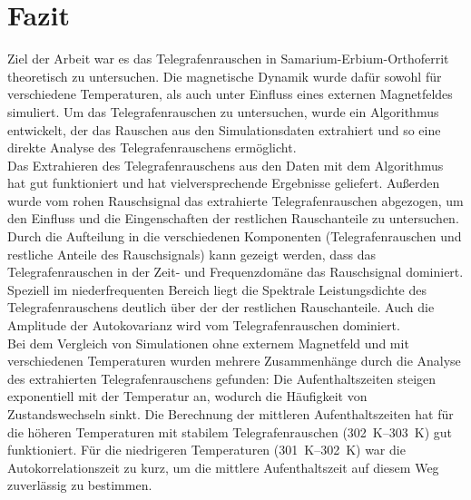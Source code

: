 \documentclass[main.tex]{subfiles}
\begin{document}
\newpage
\section{Fazit}

Ziel der Arbeit war es das Telegrafenrauschen in Samarium-Erbium-Orthoferrit theoretisch zu untersuchen. Die magnetische Dynamik wurde dafür sowohl für verschiedene Temperaturen, als auch unter Einfluss eines externen Magnetfeldes simuliert. 
Um das Telegrafenrauschen zu untersuchen, wurde ein Algorithmus entwickelt, der das Rauschen aus den Simulationsdaten extrahiert und so eine direkte Analyse des Telegrafenrauschens ermöglicht.\\

Das Extrahieren des Telegrafenrauschens aus den Daten mit dem Algorithmus hat gut funktioniert und hat vielversprechende Ergebnisse geliefert.
Außerden wurde vom rohen Rauschsignal das extrahierte Telegrafenrauschen abgezogen, um den Einfluss und die Eingenschaften der restlichen Rauschanteile zu untersuchen.
Durch die Aufteilung in die verschiedenen Komponenten (Telegrafenrauschen und restliche Anteile des Rauschsignals) kann gezeigt werden, dass das Telegrafenrauschen in der Zeit- und Frequenzdomäne das Rauschsignal dominiert. Speziell im niederfrequenten Bereich liegt die Spektrale Leistungsdichte des Telegrafenrauschens deutlich über der der restlichen Rauschanteile. Auch die Amplitude der Autokovarianz wird vom Telegrafenrauschen dominiert.\\

Bei dem Vergleich von Simulationen ohne externem Magnetfeld und mit verschiedenen Temperaturen wurden mehrere Zusammenhänge durch die Analyse des extrahierten Telegrafenrauschens gefunden:
Die Aufenthaltszeiten steigen exponentiell mit der Temperatur an, wodurch die Häufigkeit von Zustandswechseln sinkt. Die Berechnung der mittleren Aufenthaltszeiten hat für die höheren Temperaturen mit stabilem Telegrafenrauschen (\SIrange{302}{303}{\kelvin}) gut funktioniert. Für die niedrigeren Temperaturen (\SIrange{301}{302}{\kelvin}) war die Autokorrelationszeit zu kurz, um die mittlere Aufenthaltszeit auf diesem Weg zuverlässig zu bestimmen.\\
\end{document}

